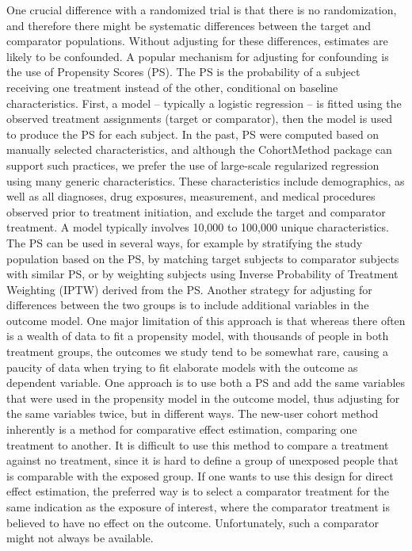 \documentclass[]{book}
\begin{document}
One crucial difference with a randomized trial is that there is no
randomization, and therefore there might be systematic differences
between the target and comparator populations. Without adjusting for
these differences, estimates are likely to be confounded. A popular
mechanism for adjusting for confounding is the use of Propensity Scores
(PS). The PS is the probability of a subject receiving one treatment
instead of the other, conditional on baseline characteristics.
\citep{rosenbaum_1983} First, a model -- typically a logistic regression
-- is fitted using the observed treatment assignments (target or
comparator), then the model is used to produce the PS for each subject.
In the past, PS were computed based on manually selected
characteristics, and although the CohortMethod package can support such
practices, we prefer the use of large-scale regularized regression using
many generic characteristics. \citep{tian_2018} These characteristics
include demographics, as well as all diagnoses, drug exposures,
measurement, and medical procedures observed prior to treatment
initiation, and exclude the target and comparator treatment. A model
typically involves 10,000 to 100,000 unique characteristics. The PS can
be used in several ways, for example by stratifying the study population
based on the PS, by matching target subjects to comparator subjects with
similar PS, or by weighting subjects using Inverse Probability of
Treatment Weighting (IPTW) derived from the PS. Another strategy for
adjusting for differences between the two groups is to include
additional variables in the outcome model. One major limitation of this
approach is that whereas there often is a wealth of data to fit a
propensity model, with thousands of people in both treatment groups, the
outcomes we study tend to be somewhat rare, causing a paucity of data
when trying to fit elaborate models with the outcome as dependent
variable. One approach is to use both a PS and add the same variables
that were used in the propensity model in the outcome model, thus
adjusting for the same variables twice, but in different ways. The
new-user cohort method inherently is a method for comparative effect
estimation, comparing one treatment to another. It is difficult to use
this method to compare a treatment against no treatment, since it is
hard to define a group of unexposed people that is comparable with the
exposed group. If one wants to use this design for direct effect
estimation, the preferred way is to select a comparator treatment for
the same indication as the exposure of interest, where the comparator
treatment is believed to have no effect on the outcome. Unfortunately,
such a comparator might not always be available.
\end{document}
